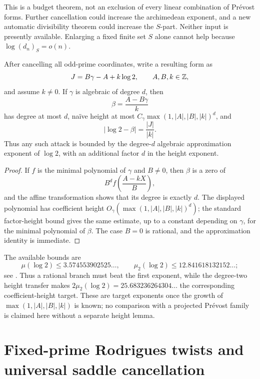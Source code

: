 \begin{remark}
This is a budget theorem, not an exclusion of every linear combination of
Pr\'evost forms.  Further cancellation could increase the archimedean
exponent, and a new automatic divisibility theorem could increase the
\(S\)-part.  Neither input is presently available.  Enlarging a fixed finite
set \(S\) alone cannot help because \(\log(d_n)_S=o(n)\).
\end{remark}

\begin{proposition}
\label{prop:bounded-degree-transfer}
After cancelling all odd-prime coordinates, write a resulting form as
\[
 J=B\gamma-A+k\log2,
 \qquad A,B,k\in\mathbb Z,
\]
and assume \(k\ne0\).  If \(\gamma\) is algebraic of degree \(d\), then
\[
 \beta=\frac{A-B\gamma}{k}
\]
has degree at most \(d\), naïve height at most
\(C_\gamma\max(1,|A|,|B|,|k|)^d\), and
\[
 |\log2-\beta|=\frac{|J|}{|k|}.
\]
Thus any such attack is bounded by the degree-\(d\) algebraic approximation
exponent of \(\log2\), with an additional factor \(d\) in the height
exponent.
\end{proposition}

\begin{proof}
If \(f\) is the minimal polynomial of \(\gamma\) and \(B\ne0\), then
\(\beta\) is a zero of
\[
 B^df\!\left(\frac{A-kX}{B}\right),
\]
and the affine transformation shows that its degree is exactly \(d\).
The displayed polynomial has coefficient height
\(O_\gamma(\max(1,|A|,|B|,|k|)^d)\); the standard factor-height bound
gives the same estimate, up to a constant depending on \(\gamma\), for the
minimal polynomial of \(\beta\).  The case \(B=0\) is rational, and the
approximation identity is immediate.
\end{proof}

\begin{remark}
The available bounds are
\[
 \mu(\log2)\le3.574553902525\ldots,
 \qquad
 \mu_2(\log2)\le12.841618132152\ldots;
\]
see \cite{Marcovecchio2009,Marcovecchio2025}.  Thus a rational branch must
beat the first exponent, while the degree-two height transfer makes
\(2\mu_2(\log2)=25.683236264304\ldots\) the corresponding coefficient-height
target.  These are target exponents once the growth of
\(\max(1,|A|,|B|,|k|)\) is known; no comparison with a projected Pr\'evost
family is claimed here without a separate height lemma.
\end{remark}

\section{Fixed-prime Rodrigues twists and universal saddle cancellation}
\label{sec:fixed-prime-rodrigues}

